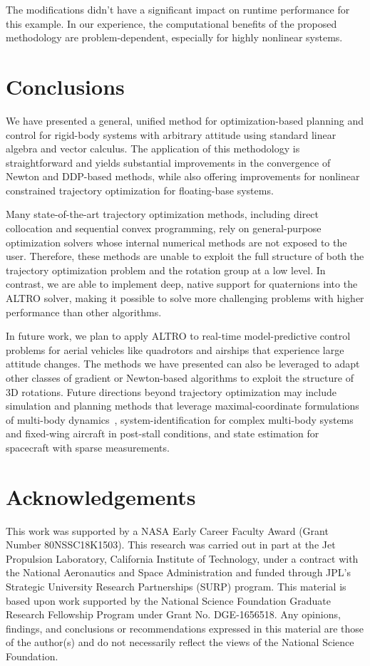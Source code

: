 \documentclass[letterpaper, 10 pt, conference]{ieeeconf}  %
\begin{document}
        The modifications didn't have a significant impact on runtime performance for this
        example. In our experience, the computational benefits of the proposed methodology are
        problem-dependent, especially for highly nonlinear systems. 

\section{Conclusions} \label{sec:conclusion}
    We have presented a general, unified method for optimization-based planning and control for rigid-body
    systems with arbitrary attitude using standard linear algebra and vector calculus.
    The application of this methodology is straightforward and
    yields substantial improvements in the convergence of Newton and DDP-based methods, while also offering improvements for nonlinear constrained
    trajectory optimization for floating-base systems.
    
    Many state-of-the-art trajectory optimization methods, including direct collocation and sequential convex programming, rely on general-purpose optimization solvers whose internal numerical methods are not exposed to the user. Therefore, these methods are unable to exploit the full structure of both the trajectory optimization problem and the rotation group at a low level. In contrast, we are able to implement deep, native support for quaternions into the ALTRO solver, making it possible to solve more challenging problems with higher performance than other algorithms.

    In future work, we plan to apply ALTRO to real-time model-predictive control problems for aerial vehicles like quadrotors and airships that experience large attitude changes. The methods we have presented can also be leveraged to adapt other classes of gradient or Newton-based algorithms to exploit the structure of 3D rotations. Future directions beyond trajectory optimization may include simulation and planning methods that leverage maximal-coordinate formulations of multi-body dynamics~\cite{brudigam2020linear}, system-identification for complex multi-body systems and fixed-wing aircraft in post-stall conditions, and state estimation for spacecraft with sparse measurements. 

\section*{Acknowledgements}
This work was supported by a NASA Early Career Faculty Award (Grant Number 80NSSC18K1503).
This research was carried out in part at the Jet Propulsion Laboratory, California Institute of Technology, under a contract with the National Aeronautics and Space Administration and funded through JPL’s Strategic University Research Partnerships (SURP) program.
This material is based upon work supported by the National Science Foundation Graduate
Research Fellowship Program under Grant No. DGE-1656518. Any opinions, findings, and
conclusions or recommendations expressed in this material are those of the author(s) and
do not necessarily reflect the views of the National Science Foundation.


\printbibliography
\end{document}
